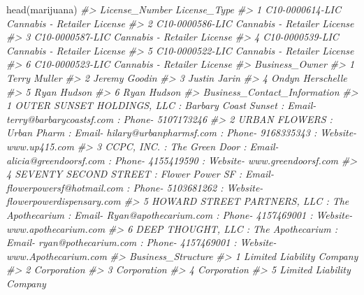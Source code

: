 \documentclass[
  12pt,
  openany]{book}
\newenvironment{Shaded}{\begin{snugshade}}{\end{snugshade}}
\newcommand{\CommentTok}[1]{\textcolor[rgb]{0.37,0.37,0.37}{\textit{#1}}}
\newcommand{\FunctionTok}[1]{\textcolor[rgb]{0,0,0}{#1}}
\newcommand{\NormalTok}[1]{#1}
\begin{document}
\begin{Shaded}
\begin{Highlighting}[]
\FunctionTok{head}\NormalTok{(marijuana)}
\CommentTok{\#\textgreater{}    License\_Number                License\_Type}
\CommentTok{\#\textgreater{} 1 C10{-}0000614{-}LIC Cannabis {-} Retailer License}
\CommentTok{\#\textgreater{} 2 C10{-}0000586{-}LIC Cannabis {-} Retailer License}
\CommentTok{\#\textgreater{} 3 C10{-}0000587{-}LIC Cannabis {-} Retailer License}
\CommentTok{\#\textgreater{} 4 C10{-}0000539{-}LIC Cannabis {-} Retailer License}
\CommentTok{\#\textgreater{} 5 C10{-}0000522{-}LIC Cannabis {-} Retailer License}
\CommentTok{\#\textgreater{} 6 C10{-}0000523{-}LIC Cannabis {-} Retailer License}
\CommentTok{\#\textgreater{}     Business\_Owner}
\CommentTok{\#\textgreater{} 1     Terry Muller}
\CommentTok{\#\textgreater{} 2    Jeremy Goodin}
\CommentTok{\#\textgreater{} 3     Justin Jarin}
\CommentTok{\#\textgreater{} 4 Ondyn Herschelle}
\CommentTok{\#\textgreater{} 5      Ryan Hudson}
\CommentTok{\#\textgreater{} 6      Ryan Hudson}
\CommentTok{\#\textgreater{}                                                                                                           Business\_Contact\_Information}
\CommentTok{\#\textgreater{} 1                             OUTER SUNSET HOLDINGS, LLC  : Barbary Coast Sunset : Email{-} terry@barbarycoastsf.com : Phone{-} 5107173246}
\CommentTok{\#\textgreater{} 2                           URBAN FLOWERS  : Urban Pharm : Email{-} hilary@urbanpharmsf.com : Phone{-} 9168335343 : Website{-} www.up415.com}
\CommentTok{\#\textgreater{} 3                      CCPC, INC.  : The Green Door : Email{-} alicia@greendoorsf.com : Phone{-} 4155419590 : Website{-} www.greendoorsf.com}
\CommentTok{\#\textgreater{} 4 SEVENTY SECOND STREET  : Flower Power SF : Email{-} flowerpowersf@hotmail.com : Phone{-} 5103681262 : Website{-} flowerpowerdispensary.com}
\CommentTok{\#\textgreater{} 5   HOWARD STREET PARTNERS, LLC  : The Apothecarium : Email{-} Ryan@apothecarium.com : Phone{-} 4157469001 : Website{-} www.apothecarium.com}
\CommentTok{\#\textgreater{} 6              DEEP THOUGHT, LLC  : The Apothecarium : Email{-} ryan@pothecarium.com : Phone{-} 4157469001 : Website{-} www.Apothecarium.com}
\CommentTok{\#\textgreater{}          Business\_Structure}
\CommentTok{\#\textgreater{} 1 Limited Liability Company}
\CommentTok{\#\textgreater{} 2               Corporation}
\CommentTok{\#\textgreater{} 3               Corporation}
\CommentTok{\#\textgreater{} 4               Corporation}
\CommentTok{\#\textgreater{} 5 Limited Liability Company}

\end{Highlighting}
\end{Shaded}
\end{document}
